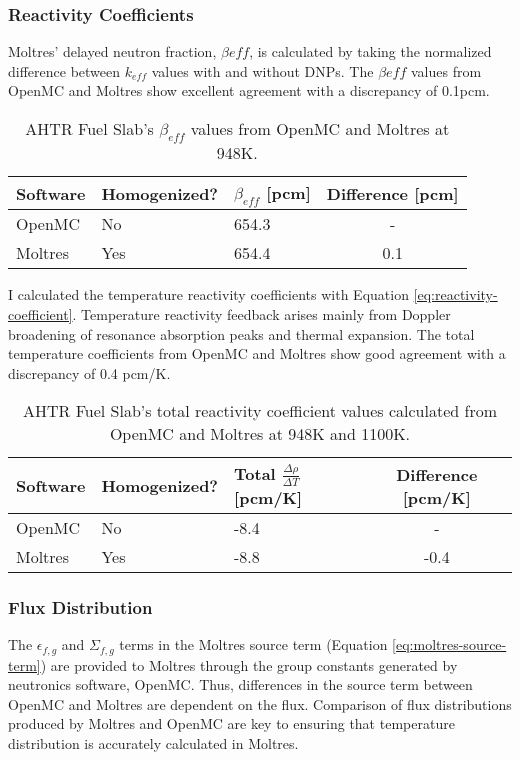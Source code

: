 \subsubsection{Reactivity Coefficients}
Moltres' delayed neutron fraction, $\beta{eff}$, is calculated by taking the 
normalized difference between $k_{eff}$ values with and without DNPs. 
The  $\beta{eff}$ values from OpenMC and Moltres show excellent 
agreement with a discrepancy of 0.1pcm. 
\begin{table}[]
    \centering
    \onehalfspacing
    \caption{AHTR Fuel Slab's $\beta_{eff}$ values from OpenMC and Moltres at 948K.}
	\label{tab:betaeff_ahtr_moltres}
    \footnotesize
    \begin{tabular}{lllc}
    \hline 
    \textbf{Software}& \textbf{Homogenized?}& \textbf{$\beta_{eff}$ [pcm]} 
    & \textbf{Difference [pcm]}  \\
    \hline 
    OpenMC & No &  654.3 & - \\ 
    Moltres & Yes & 654.4 & 0.1\\ 
    \hline
    \end{tabular}
\end{table}
I calculated the temperature reactivity coefficients with Equation 
\ref{eq:reactivity-coefficient}.
Temperature reactivity feedback arises mainly from Doppler broadening of 
resonance absorption peaks and thermal expansion.
The total temperature coefficients from OpenMC and Moltres show good 
agreement with a discrepancy of 0.4 pcm/K.
\begin{table}[]
    \centering
    \onehalfspacing
    \caption{AHTR Fuel Slab's total reactivity coefficient values calculated from 
    OpenMC and Moltres at 948K and 1100K.}
	\label{tab:reactivity_ahtr_moltres}
    \footnotesize
    \begin{tabular}{lllc}
    \hline 
    \textbf{Software}& \textbf{Homogenized?}& \textbf{Total $\frac{\Delta \rho}{\Delta T}$ [pcm/K]} 
    & \textbf{Difference [pcm/K]}  \\
    \hline 
    OpenMC & No &  -8.4 & - \\ 
    Moltres & Yes & -8.8 & -0.4\\ 
    \hline
    \end{tabular}
\end{table}

\subsubsection{Flux Distribution}
The $\epsilon_{f,g}$ and $\Sigma_{f,g}$ terms in the Moltres source term (Equation 
\ref{eq:moltres-source-term}) are provided to Moltres through 
the group constants generated by neutronics software, OpenMC.
Thus, differences in the source term between OpenMC and Moltres are dependent on 
the flux. 
Comparison of flux distributions produced by Moltres and OpenMC are key to 
ensuring that temperature distribution is accurately calculated in Moltres.

